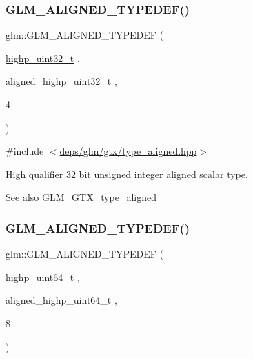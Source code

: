 \subsubsection{\texorpdfstring{G\+L\+M\+\_\+\+A\+L\+I\+G\+N\+E\+D\+\_\+\+T\+Y\+P\+E\+D\+E\+F()}{GLM\_ALIGNED\_TYPEDEF()}\hspace{0.1cm}{\footnotesize\ttfamily [99/209]}}
{\footnotesize\ttfamily glm\+::\+G\+L\+M\+\_\+\+A\+L\+I\+G\+N\+E\+D\+\_\+\+T\+Y\+P\+E\+D\+EF (\begin{DoxyParamCaption}\item[{\hyperlink{group__gtc__type__precision_ga8eb85ad460079c63b68866ae34637bda}{highp\+\_\+uint32\+\_\+t}}]{,  }\item[{aligned\+\_\+highp\+\_\+uint32\+\_\+t}]{,  }\item[{4}]{ }\end{DoxyParamCaption})}



{\ttfamily \#include $<$\hyperlink{gtx_2type__aligned_8hpp}{deps/glm/gtx/type\+\_\+aligned.\+hpp}$>$}

High qualifier 32 bit unsigned integer aligned scalar type. \begin{DoxySeeAlso}{See also}
\hyperlink{group__gtx__type__aligned}{G\+L\+M\+\_\+\+G\+T\+X\+\_\+type\+\_\+aligned} 
\end{DoxySeeAlso}
\mbox{\label{group__gtx__type__aligned_ga71e646f7e301aa422328194162c9c998}} 
\subsubsection{\texorpdfstring{G\+L\+M\+\_\+\+A\+L\+I\+G\+N\+E\+D\+\_\+\+T\+Y\+P\+E\+D\+E\+F()}{GLM\_ALIGNED\_TYPEDEF()}\hspace{0.1cm}{\footnotesize\ttfamily [100/209]}}
{\footnotesize\ttfamily glm\+::\+G\+L\+M\+\_\+\+A\+L\+I\+G\+N\+E\+D\+\_\+\+T\+Y\+P\+E\+D\+EF (\begin{DoxyParamCaption}\item[{\hyperlink{group__gtc__type__precision_ga6e66f40c5909bfc872b068187fa6029e}{highp\+\_\+uint64\+\_\+t}}]{,  }\item[{aligned\+\_\+highp\+\_\+uint64\+\_\+t}]{,  }\item[{8}]{ }\end{DoxyParamCaption})}



